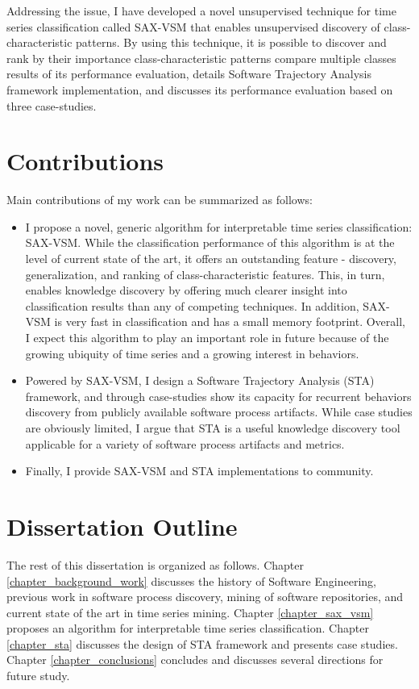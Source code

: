 Addressing the issue, I have developed a novel unsupervised technique for time series classification 
called SAX-VSM that enables unsupervised discovery of class-characteristic patterns. 
By using this technique, it is possible to discover and rank by their importance class-characteristic 
patterns compare multiple classes 
results of its performance evaluation, details Software Trajectory Analysis framework implementation, 
and discusses its performance evaluation based on three case-studies.

\section{Contributions}\label{section_contributions}
Main contributions of my work can be summarized as follows: 
\begin{itemize}
\item I propose a novel, generic algorithm for interpretable time series classification: SAX-VSM. 
While the classification performance of this algorithm is at the level of current state of the art, 
it offers an outstanding feature - discovery, generalization, and ranking of class-characteristic features. 
This, in turn, enables knowledge discovery by offering much clearer insight into classification results than any of 
competing techniques.
In addition, SAX-VSM is very fast in classification and has a small memory footprint. 
Overall, I expect this algorithm to play an important role in future because of the growing ubiquity of time series and 
a growing interest in behaviors.
\item Powered by SAX-VSM, I design a Software Trajectory Analysis (STA) framework, and through case-studies 
show its capacity for recurrent behaviors discovery from publicly available software process
artifacts. While case studies are obviously limited, I argue that STA is a useful knowledge discovery tool applicable for a 
variety of software process artifacts and metrics. 
\item Finally, I provide SAX-VSM and STA implementations to community.
\end{itemize}

\section{Dissertation Outline}\label{section_organization}
The rest of this dissertation is organized as follows. Chapter \ref{chapter_background_work} discusses the history 
of Software Engineering, previous work in software process discovery, mining of software repositories, and current 
state of the art in time series mining. Chapter \ref{chapter_sax_vsm} proposes an algorithm for interpretable 
time series classification. Chapter \ref{chapter_sta} discusses the design of STA framework and presents case studies.
Chapter \ref{chapter_conclusions} concludes and discusses several directions for future study.